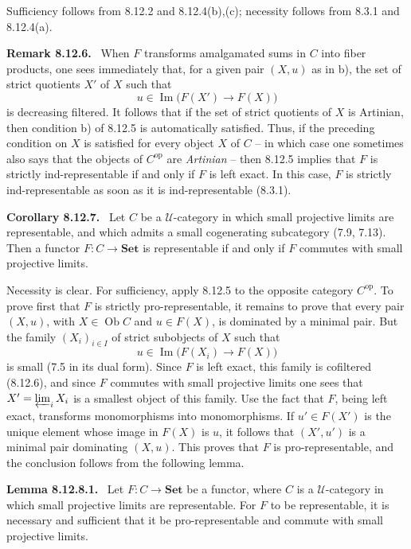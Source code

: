 \documentclass[11pt]{article}
\newcommand{\U}{\mathcal{U}}
\newcommand{\Set}{\mathbf{Set}}
\newcommand{\Ob}{\operatorname{Ob}}
\newcommand{\Imn}{\operatorname{Im}}
\newcommand{\op}{\mathrm{op}}
\newenvironment{statement}[1]{\par\medskip\noindent\textbf{#1.}\ }{\par\medskip}
\begin{document}
Sufficiency follows from 8.12.2 and 8.12.4(b),(c); necessity follows from 8.3.1 and 8.12.4(a).

\begin{statement}{Remark 8.12.6}
When $F$ transforms amalgamated sums in $C$ into fiber products, one sees immediately that, for a given pair $(X,u)$ as in b), the set of strict quotients $X'$ of $X$ such that
\[
 u\in\Imn\bigl(F(X')\to F(X)\bigr)
\]
is decreasing filtered. It follows that if the set of strict quotients of $X$ is Artinian, then condition b) of 8.12.5 is automatically satisfied. Thus, if the preceding condition on $X$ is satisfied for every object $X$ of $C$ -- in which case one sometimes also says that the objects of $C^\op$ are \emph{Artinian} -- then 8.12.5 implies that $F$ is strictly ind-representable if and only if $F$ is left exact. In this case, $F$ is strictly ind-representable as soon as it is ind-representable (8.3.1).
\end{statement}

\begin{statement}{Corollary 8.12.7}
Let $C$ be a $\U$-category in which small projective limits are representable, and which admits a small cogenerating subcategory (7.9, 7.13). Then a functor $F:C\to\Set$ is representable if and only if $F$ commutes with small projective limits.
\end{statement}

Necessity is clear. For sufficiency, apply 8.12.5 to the opposite category $C^\op$. To prove first that $F$ is strictly pro-representable, it remains to prove that every pair $(X,u)$, with $X\in\Ob C$ and $u\in F(X)$, is dominated by a minimal pair. But the family $(X_i)_{i\in I}$ of strict subobjects of $X$ such that
\[
 u\in\Imn\bigl(F(X_i)\to F(X)\bigr)
\]
is small (7.5 in its dual form). Since $F$ is left exact, this family is cofiltered (8.12.6), and since $F$ commutes with small projective limits one sees that $X'=\varprojlim_i X_i$ is a smallest object of this family. Use the fact that $F$, being left exact, transforms monomorphisms into monomorphisms. If $u'\in F(X')$ is the unique element whose image in $F(X)$ is $u$, it follows that $(X',u')$ is a minimal pair dominating $(X,u)$. This proves that $F$ is pro-representable, and the conclusion follows from the following lemma.

\begin{statement}{Lemma 8.12.8.1}
Let $F:C\to\Set$ be a functor, where $C$ is a $\U$-category in which small projective limits are representable. For $F$ to be representable, it is necessary and sufficient that it be pro-representable and commute with small projective limits.
\end{statement}
\end{document}
